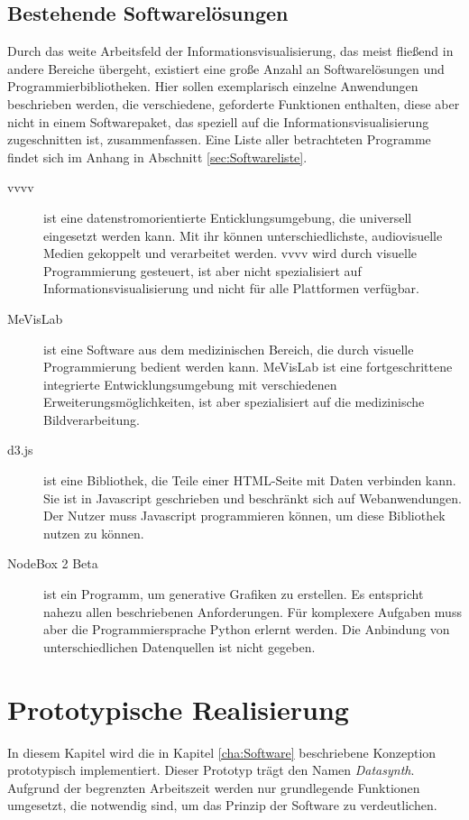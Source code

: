 \documentclass[a4paper, 
               12pt,
               DIV=calc,
               version=first,
               pdftex,
               headsepline,
               footsepline,
               bibtotocnumbered,
               liststotocnumbered]{scrreprt}
\begin{document}
\section{Bestehende Softwarelösungen}
\label{sec:bestehendeSoftware}
Durch das weite Arbeitsfeld der Informationsvisualisierung, das meist
fließend in andere Bereiche übergeht, existiert eine große Anzahl an
Softwarelösungen und Programmierbibliotheken. Hier sollen exemplarisch
einzelne Anwendungen beschrieben werden, die verschiedene, geforderte
Funktionen enthalten, diese aber nicht in einem Softwarepaket, das
speziell auf die Informationsvisualisierung zugeschnitten ist, zusammenfassen.
Eine Liste aller betrachteten Programme findet sich im Anhang in Abschnitt
\ref{sec:Softwareliste}.
\begin{description}
\item[vvvv]
ist eine datenstromorientierte Enticklungsumgebung, die universell eingesetzt werden kann.
Mit ihr können unterschiedlichste, audiovisuelle Medien gekoppelt und
verarbeitet werden. vvvv wird durch visuelle Programmierung gesteuert, ist aber
nicht spezialisiert auf Informationsvisualisierung und nicht für alle
Plattformen verfügbar.
\item[MeVisLab]
ist eine Software aus dem medizinischen Bereich, die durch visuelle
Programmierung bedient werden kann. MeVisLab ist eine fortgeschrittene
integrierte Entwicklungsumgebung mit verschiedenen
Erweiterungsmöglichkeiten, ist aber spezialisiert auf die medizinische
Bildverarbeitung.
\item[d3.js]
ist eine Bibliothek, die Teile einer HTML-Seite mit Daten verbinden kann.
Sie ist in Javascript geschrieben und beschränkt sich auf
Webanwendungen. Der Nutzer muss Javascript programmieren können, um diese
Bibliothek nutzen zu können.
\item[NodeBox 2 Beta]
ist ein Programm, um generative Grafiken zu erstellen. Es entspricht nahezu
allen beschriebenen Anforderungen. Für komplexere Aufgaben muss aber
die Programmiersprache Python erlernt werden. Die Anbindung von unterschiedlichen Datenquellen
ist nicht gegeben.
\end{description}

\chapter{Prototypische Realisierung}
\label{cha:Umsetzung}
In diesem Kapitel wird die in Kapitel \ref{cha:Software} beschriebene Konzeption prototypisch implementiert.
Dieser Prototyp trägt den Namen \textit{Datasynth}.
Aufgrund der begrenzten Arbeitszeit werden nur grundlegende Funktionen umgesetzt,
die notwendig sind, um das Prinzip der Software zu verdeutlichen.
\end{document}
